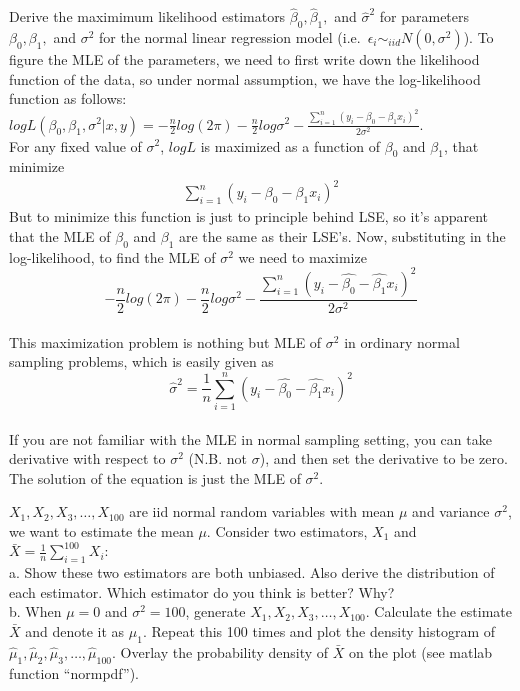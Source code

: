 \documentclass[12pt]{article}
\begin{document}
 { Derive the maximimum likelihood estimators $\hat
\beta_0, \hat \beta_1,$ and $\hat \sigma^2$ for parameters $\beta_0,
\beta_1,$ and $\sigma^2$ for the normal linear regression model
(i.e.~$\epsilon_i \sim_{iid} N(0,\sigma^2)$). } { \vfill
  \answer
}
{
To figure the MLE of the parameters, we need to first write down
the likelihood function of the data, so under normal assumption, we
have the log-likelihood function as follows:\\
$logL(\beta_0,\beta_1,\sigma^2|x,y)=-\frac{n}{2}log(2\pi)-\frac{n}{2}log\sigma^2-\frac{\displaystyle\sum_{i=1}^{n}(y_i-\beta_0-\beta_1x_i)^2}{2\sigma^2}.$\\
For any fixed value of $\sigma^2$, $logL$ is maximized as a function
of $\beta_0$ and $\beta_1$, that minimize
\begin{eqnarray}
\displaystyle\sum_{i=1}^{n}(y_i-\beta_0-\beta_1x_i)^2
\end{eqnarray}
But to minimize this function is just to principle behind LSE, so
it's apparent that the MLE of $\beta_0$ and $\beta_1$ are the same
as their LSE's. Now, substituting in the log-likelihood, to find the
MLE of $\sigma^2$ we need to maximize\\
\[-\frac{n}{2}log(2\pi)-\frac{n}{2}log\sigma^2-\frac{\displaystyle\sum_{i=1}^{n}(y_i-\hat{\beta_0}-\hat{\beta_1}x_i)^2}{2\sigma^2}\]\\
This maximization problem is nothing but MLE of $\sigma^2$ in
ordinary normal sampling problems, which is easily given as\\
\[\hat{\sigma}^2=\frac{1}{n}\displaystyle\sum_{i=1}^{n}(y_i-\hat{\beta_0}-\hat{\beta_1}x_i)^2\]\\
If you are not familiar with the MLE in normal sampling setting, you
can take derivative with respect to $\sigma^2$ (N.B. not $\sigma$),
and then set the derivative to be zero. The solution of the equation
is just the MLE of $\sigma^2$.\\
}


 {$X_1,X_2,X_3,\ldots,X_{100}$ are iid normal random 
variables with mean $\mu$ and variance $\sigma^2$, we want to estimate 
the mean $\mu$. Consider two estimators, $X_1$ and $\bar{X}=\frac{1}{n}\sum_{i=1}^{100}X_i$: \\
a. Show these two estimators are both unbiased. Also derive the
distribution of each estimator. Which estimator do you think is better? Why?\\
b. When $\mu=0$ and $\sigma^2=100$, generate $X_1,X_2,X_3,\ldots,X_{100}$. Calculate the estimate $\bar{X}$ and denote
it as $\hat{\mu}_1$. Repeat this 100 times and plot the density histogram of $\hat{\mu}_1,
\hat{\mu}_2,\hat{\mu}_3,\ldots,\hat{\mu}_{100}$. Overlay the probability density of $\bar{X}$ on the plot (see matlab function ``normpdf''). \\}
 { \vfill
  \answer
} { }
\end{document}
